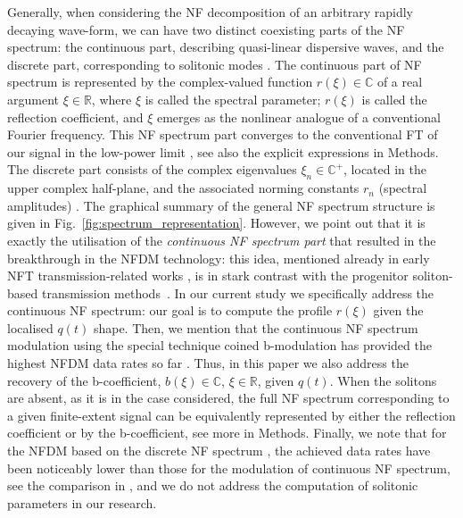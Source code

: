 Generally, when considering the NF decomposition of an arbitrary rapidly decaying wave-form, we can have two distinct coexisting parts of the NF spectrum: the continuous part, describing quasi-linear dispersive waves, and the discrete part, corresponding to solitonic modes \cite{nmp84,akn74,tplwfkd17,yk14-1}. The continuous part of NF spectrum is represented by the complex-valued function $r(\xi) \in \mathbb{C}$ of a real argument $\xi \in \mathbb{R}$, where $\xi$ is called the spectral parameter; $r(\xi)$ is called the reflection coefficient, and $\xi$ emerges as the nonlinear analogue of a conventional Fourier frequency. This NF spectrum part converges to the conventional FT of our signal in the low-power limit \cite{pdt13}, see also the explicit expressions in Methods. The discrete part consists of the complex eigenvalues $\xi_n \in \mathbb{C}^{+}$, located in the upper complex half-plane, and the associated norming constants $r_n$ (spectral amplitudes) \cite{a16}. The graphical summary of the general NF spectrum structure is given in Fig.~\ref{fig:spectrum_representation}. However, we point out that it is exactly the utilisation of the \textit{continuous NF spectrum part} \cite{pdbgt14,lpt14,lpt15,lpr15,lpphet16,lab17,kplt17_2,yy19} that resulted in the breakthrough in the NFDM technology: this idea, mentioned already in early NFT transmission-related works \cite{yk14-1,pdt13}, is in stark contrast with the progenitor soliton-based transmission methods~\cite{mg06}. In our current study we specifically address the continuous NF spectrum: our goal is to compute the profile $r(\xi)$ given the localised $q(t)$ shape. Then, we mention that the continuous NF spectrum modulation using the special technique coined b-modulation \cite{w17,gzl18,svp20,cw20} has provided the highest NFDM data rates so far \cite{yal19,yla19}. Thus, in this paper we also address the recovery of the b-coefficient, $b(\xi) \in \mathbb{C}$, $\xi \in \mathbb{R}$, given $q(t)$. When the solitons are absent, as it is in the case considered, the full NF spectrum corresponding to a given finite-extent signal can be equivalently represented by either the reflection coefficient or by the b-coefficient, see more in Methods. Finally, we note that for the NFDM based on the discrete NF spectrum \cite{hyk16,bai16,wxz20}, the achieved data rates have been noticeably lower than those for the modulation of continuous NF spectrum, see the comparison in \cite[Fig. 1]{yal19}, and we do not address the computation of solitonic parameters in our research.
